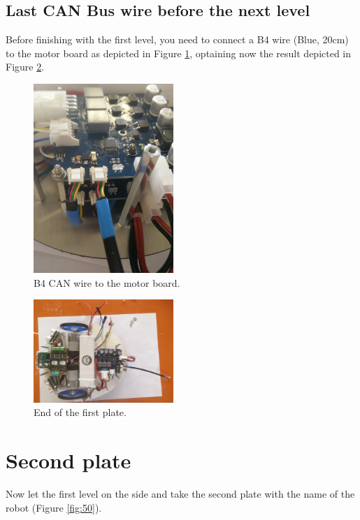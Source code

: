 \documentclass[10pt,a4paper]{report}   %
\begin{document}
\section{Last CAN Bus wire before the next level}

Before finishing with the first level, you need to connect a B4 wire (Blue, 20cm) to the motor board as depicted in Figure \ref{fig:49_2}, optaining now the result depicted in Figure \ref{fig:49_3}.

\begin{figure}[H]
\center
\includegraphics[width=200px]{images/49_2.jpg}
\caption{B4 CAN wire to the motor board.}
\label{fig:49_2}

\end{figure}
\begin{figure}[H]
\center
\includegraphics[width=200px]{images/49_3.jpg}
\caption{End of the first plate.}
\label{fig:49_3}
\end{figure}


\chapter{Second plate}

Now let the first level on the side and take the second plate with the name of the robot (Figure \ref{fig:50}).
\end{document}
